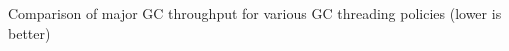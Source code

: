 \label{fig:staticopt:compare:vm}Comparison of major GC throughput for various GC threading policies (lower is better)
